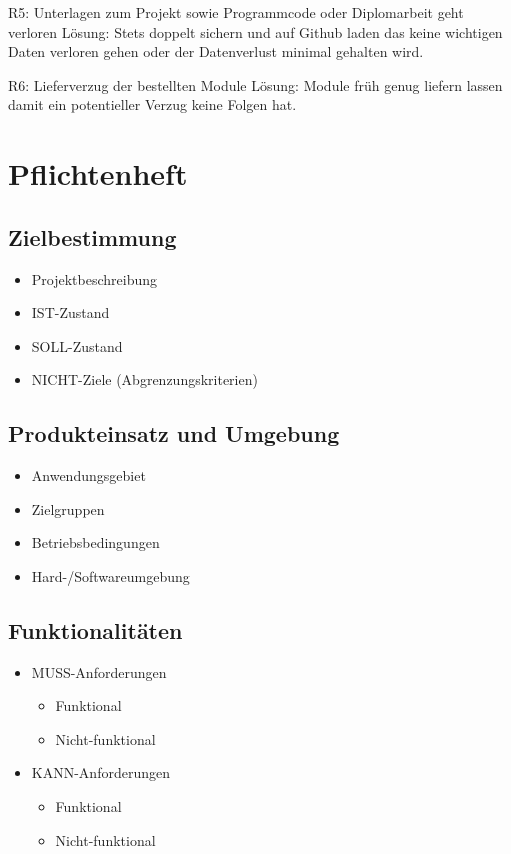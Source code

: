 	R5: Unterlagen zum Projekt sowie Programmcode oder Diplomarbeit geht verloren \newline
	Lösung: Stets doppelt sichern und auf Github laden das keine wichtigen Daten verloren gehen oder der Datenverlust minimal gehalten wird. 
	 
    R6: Lieferverzug der bestellten Module \newline
	Lösung: Module früh genug liefern lassen damit ein potentieller Verzug keine Folgen hat.  

	



\newpage
\section{Pflichtenheft}
\subsection{Zielbestimmung}
\begin{itemize}
	\item Projektbeschreibung
	\item IST-Zustand
	\item SOLL-Zustand
	\item NICHT-Ziele (Abgrenzungskriterien)
\end{itemize}
\subsection{Produkteinsatz und Umgebung}
\begin{itemize}
	\item Anwendungsgebiet
	\item Zielgruppen
	\item Betriebsbedingungen
	\item Hard-/Softwareumgebung
\end{itemize}
\subsection{Funktionalitäten}
\begin{itemize}
	\item MUSS-Anforderungen
	\begin{itemize}
		\item Funktional
		\item Nicht-funktional
	\end{itemize}
	\item KANN-Anforderungen
	\begin{itemize}
		\item Funktional
		\item Nicht-funktional
	\end{itemize}
\end{itemize}
